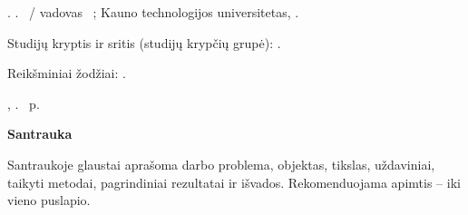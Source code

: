 
\begin{titlepage}

\projectAuthorNameLT. \projectTitleLT. \projectTypeLT\ / vadovas \projectSupervisorPositionLT~\projectSupervisorNameLT; Kauno technologijos universitetas, \projectFacultyLT.

Studijų kryptis ir sritis (studijų krypčių grupė): \projectStudyFieldAndAreaLT.

Reikšminiai žodžiai: \projectKeywordsLT.

\projectCity, \projectYear. \pageref{LastPage}~p.

\vspace{0.5cm}
\begin{center}
  \textbf{Santrauka}
\end{center}

Santraukoje glaustai aprašoma darbo problema, objektas, tikslas, uždaviniai, taikyti metodai, pagrindiniai rezultatai ir išvados. Rekomenduojama apimtis -- iki vieno puslapio.

\lipsum[1-2]

\end{titlepage}
